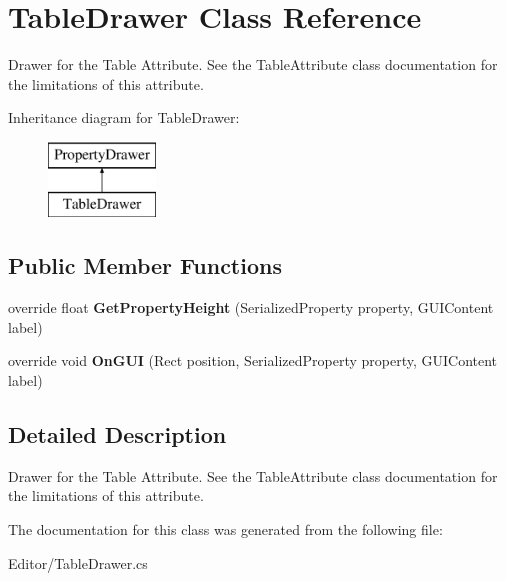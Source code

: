 \hypertarget{class_table_drawer}{}\section{Table\+Drawer Class Reference}
\label{class_table_drawer}


Drawer for the Table Attribute. See the Table\+Attribute class documentation for the limitations of this attribute.  


Inheritance diagram for Table\+Drawer\+:\begin{figure}[H]
\begin{center}
\leavevmode
\includegraphics[height=2.000000cm]{class_table_drawer}
\end{center}
\end{figure}
\subsection*{Public Member Functions}
\begin{DoxyCompactItemize}
\item 
\mbox{\label{class_table_drawer_a55a2658e4bff391c17b81437bcccd4c7}} 
override float {\bfseries Get\+Property\+Height} (Serialized\+Property property, G\+U\+I\+Content label)
\item 
\mbox{\label{class_table_drawer_a48e0473a511f4aefef385cdf16c53839}} 
override void {\bfseries On\+G\+UI} (Rect position, Serialized\+Property property, G\+U\+I\+Content label)
\end{DoxyCompactItemize}


\subsection{Detailed Description}
Drawer for the Table Attribute. See the Table\+Attribute class documentation for the limitations of this attribute. 



The documentation for this class was generated from the following file\+:\begin{DoxyCompactItemize}
\item 
Editor/Table\+Drawer.\+cs\end{DoxyCompactItemize}
